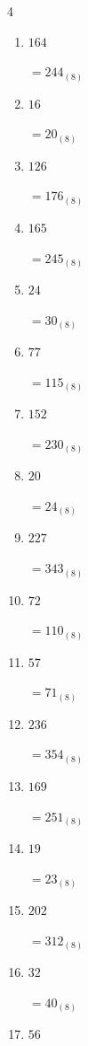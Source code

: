 \begin{multicols}{4}
\begin{enumerate}
  \item $164$

        $=244_{(8)}$

  \item $16$

        $=20_{(8)}$

\columnbreak %

  \item $126$

        $=176_{(8)}$

  \item $165$

        $=245_{(8)}$

  \item $24$

        $=30_{(8)}$

  \item $77$

        $=115_{(8)}$

  \item $152$

        $=230_{(8)}$

  \item $20$

        $=24_{(8)}$

  \item $227$

        $=343_{(8)}$

  \item $72$

        $=110_{(8)}$

  \item $57$

        $=71_{(8)}$

  \item $236$

        $=354_{(8)}$

  \item $169$

        $=251_{(8)}$

  \item $19$

        $=23_{(8)}$

  \item $202$

        $=312_{(8)}$

  \item $32$

        $=40_{(8)}$

  \item $56$


\end{enumerate}
\end{multicols}
